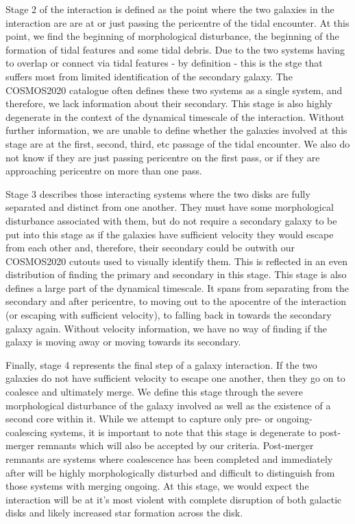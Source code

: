 Stage 2 of the interaction is defined as the point where the two galaxies in the interaction are are at or just passing the pericentre of the tidal encounter. At this point, we find the beginning of morphological disturbance, the beginning of the formation of tidal features and some tidal debris. Due to the two systems having to overlap or connect via tidal features - by definition - this is the stge that suffers most from limited identification of the secondary galaxy. The COSMOS2020 catalogue often defines these two systems as a single system, and therefore, we lack information about their secondary. This stage is also highly degenerate in the context of the dynamical timescale of the interaction. Without further information, we are unable to define whether the galaxies involved at this stage are at the first, second, third, etc passage of the tidal encounter. We also do not know if they are just passing pericentre on the first pass, or if they are approaching pericentre on more than one pass.

Stage 3 describes those interacting systems where the two disks are fully separated and distinct from one another. They must have some morphological disturbance associated with them, but do not require a secondary galaxy to be put into this stage as if the galaxies have sufficient velocity they would escape from each other and, therefore, their secondary could be outwith our COSMOS2020 cutouts used to visually identify them. This is reflected in an even distribution of finding the primary and secondary in this stage. This stage is also defines a large part of the dynamical timescale. It spans from separating from the secondary and after pericentre, to moving out to the apocentre of the interaction (or escaping with sufficient velocity), to falling back in towards the secondary galaxy again. Without velocity information, we have no way of finding if the galaxy is moving away or moving towards its secondary.

Finally, stage 4 represents the final step of a galaxy interaction. If the two galaxies do not have sufficient velocity to escape one another, then they go on to coalesce and ultimately merge. We define this stage through the severe morphological disturbance of the galaxy involved as well as the existence of a second core within it. While we attempt to capture only pre- or ongoing-coalescing systems, it is important to note that this stage is degenerate to post-merger remnants which will also be accepted by our criteria. Post-merger remnants are systems where coalescence has been completed and immediately after will be highly morphologically disturbed and difficult to distinguish from those systems with merging ongoing. At this stage, we would expect the interaction will be at it's most violent with complete disruption of both galactic disks and likely increased star formation across the disk. 

